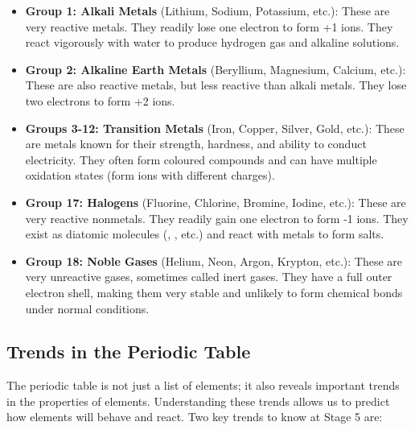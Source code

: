 \begin{itemize}
    \item \textbf{Group 1: Alkali Metals} (Lithium, Sodium, Potassium, etc.): These are very reactive metals. They readily lose one electron to form +1 ions. They react vigorously with water to produce hydrogen gas and alkaline solutions.
    \item \textbf{Group 2: Alkaline Earth Metals} (Beryllium, Magnesium, Calcium, etc.): These are also reactive metals, but less reactive than alkali metals. They lose two electrons to form +2 ions.
    \item \textbf{Groups 3-12: Transition Metals} (Iron, Copper, Silver, Gold, etc.): These are metals known for their strength, hardness, and ability to conduct electricity. They often form coloured compounds and can have multiple oxidation states (form ions with different charges).
    \item \textbf{Group 17: Halogens} (Fluorine, Chlorine, Bromine, Iodine, etc.): These are very reactive nonmetals. They readily gain one electron to form -1 ions. They exist as diatomic molecules (, , etc.) and react with metals to form salts.
    \item \textbf{Group 18: Noble Gases} (Helium, Neon, Argon, Krypton, etc.): These are very unreactive gases, sometimes called inert gases. They have a full outer electron shell, making them very stable and unlikely to form chemical bonds under normal conditions.
\end{itemize}

\subsection{Trends in the Periodic Table}


The periodic table is not just a list of elements; it also reveals important trends in the properties of elements.  Understanding these trends allows us to predict how elements will behave and react.  Two key trends to know at Stage 5 are:


